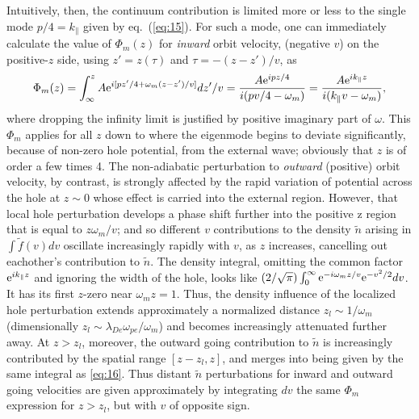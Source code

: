 \documentclass[12pt]{article}
\def\etothe#1{{\rm e}^{#1}}
\begin{document}
Intuitively, then, the continuum contribution is limited more or less
to the single mode
$p/4=k_\parallel$ given by eq.\ (\ref{eq:15}).
For such a mode, one can immediately calculate the value of
$\Phi_m(z)$ for \emph{inward} orbit velocity, (negative $v$) on the
positive-$z$ side, using $z'=z(\tau)$ and $\tau=-(z-z')/v$, as
\begin{equation}
  \label{eq:16}
  \Phi_m(z) = \int_{\infty}^zA{\rm e}^{i[pz'/4+\omega_m
    (z-z')/v]}dz'/v
  ={A{\rm e}^{ipz/4} \over i(pv/4-\omega_m)}={A{\rm e}^{ik_\parallel z} \over
    i(k_\parallel v-\omega_m)},
\end{equation}
where dropping the infinity limit is justified by positive imaginary
part of $\omega$.  This $\Phi_m$ applies for all $z$ down to where the
eigenmode begins to deviate significantly, because of non-zero hole
potential, from the external wave; obviously that $z$ is of order a
few times 4. The non-adiabatic perturbation to \emph{outward}
(positive) orbit velocity, by contrast, is strongly affected by the
rapid variation of potential across the hole at $z\sim 0$ whose effect
is carried into the external region. However, that local hole
perturbation develops a phase shift further into the positive z region
that is equal to $z\omega_m/v$; and so different $v$ contributions to
the density $\tilde n$ arising in $\int \tilde f(v) dv$ oscillate
increasingly rapidly with $v$, as $z$ increases, cancelling out
eachother's contribution to $\tilde n$. The density integral, omitting the
common factor $\etothe{ik_\parallel z}$ and ignoring the width of the
hole, looks like
$(2/\sqrt{\pi})\int_0^\infty \etothe{-i\omega_m
  z/v}\etothe{-v^2/2}dv$.  It has its first $z$-zero near
$\omega_m z=1$. Thus, the density influence of the localized hole
perturbation extends approximately a normalized distance
$z_l\sim 1/\omega_m$ (dimensionally
$z_l\sim \lambda_{De}\omega_{pe}/\omega_m$) and becomes increasingly
attenuated further away. At $z>z_l$, moreover, the outward going
contribution to $\tilde n$ is increasingly contributed by the spatial
range $[z-z_l,z]$, and merges into being given by the same integral as
\ref{eq:16}.  Thus distant $\tilde n$ perturbations for inward and
outward going velocities are given approximately by integrating $dv$
the same $\Phi_m$ expression for $z>z_l$, but with $v$ of opposite
sign.
\end{document}
